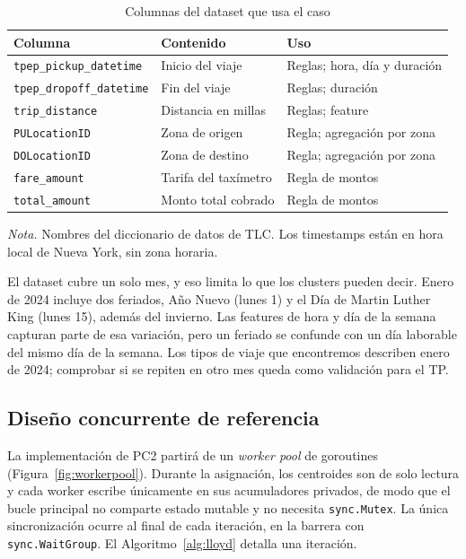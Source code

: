 \begin{table}[H]
\caption{Columnas del dataset que usa el caso}\label{tab:columnas}
\small
\begin{tabularx}{\textwidth}{@{}L{4.6cm}YL{4.2cm}@{}}
\toprule
\textbf{Columna} & \textbf{Contenido} & \textbf{Uso} \\
\midrule
\texttt{tpep\_pickup\_datetime}  & Inicio del viaje      & Reglas; hora, día y duración \\
\texttt{tpep\_dropoff\_datetime} & Fin del viaje         & Reglas; duración \\
\texttt{trip\_distance}          & Distancia en millas   & Reglas; feature \\
\texttt{PULocationID}            & Zona de origen        & Regla; agregación por zona \\
\texttt{DOLocationID}            & Zona de destino       & Regla; agregación por zona \\
\texttt{fare\_amount}            & Tarifa del taxímetro  & Regla de montos \\
\texttt{total\_amount}           & Monto total cobrado   & Regla de montos \\
\bottomrule
\end{tabularx}

{\footnotesize\textit{Nota.} Nombres del diccionario de datos de TLC. Los timestamps están en hora
local de Nueva York, sin zona horaria.}
\end{table}

El dataset cubre un solo mes, y eso limita lo que los clusters pueden decir. Enero de 2024 incluye
dos feriados, Año Nuevo (lunes 1) y el Día de Martin Luther King (lunes 15), además del invierno.
Las features de hora y día de la semana capturan parte de esa variación, pero un feriado se confunde
con un día laborable del mismo día de la semana. Los tipos de viaje que encontremos describen enero
de 2024; comprobar si se repiten en otro mes queda como validación para el TP.

\subsection{Diseño concurrente de referencia}\label{sec:diseno}

La implementación de PC2 partirá de un \emph{worker pool} de goroutines
(Figura~\ref{fig:workerpool}). Durante la asignación, los centroides son de solo lectura y cada
worker escribe únicamente en sus acumuladores privados, de modo que el bucle principal no comparte
estado mutable y no necesita \texttt{sync.Mutex}. La única sincronización ocurre al final de cada
iteración, en la barrera con \texttt{sync.WaitGroup}. El Algoritmo~\ref{alg:lloyd} detalla una
iteración.

